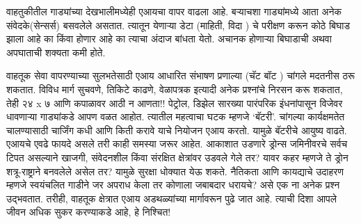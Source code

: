 वाहतुकीतील गाड्यांच्या देखभालीमध्येही एआयचा वापर वाढला आहे. बऱ्याचशा गाड्यांमध्ये आता अनेक संवेदके(सेन्सर्स) बसवलेले असतात. त्यातून येणाऱ्या डेटा (माहिती, विदा ) चे परीक्षण करून कोठे बिघाड झाला आहे का किंवा होणार आहे का त्याचा अंदाज बांधता येतो. अचानक होणाऱ्या बिघाडाची अथवा अपघाताची शक्यता कमी होते.

वाहतूक सेवा वापरण्याच्या सुलभतेसाठी एआय आधारित संभाषण प्रणाल्या (चॅट बॉट ) चांगले मदतनीस ठरू शकतात. विविध मार्ग सुचवणे, तिकिटे काढणे, वेळापत्रक इत्यादी अनेक प्रश्नांचे निरसन करू शकतात, तेही २४ x ७ आणि कपाळावर आठी न आणता!! पेट्रोल, डिझेल सारख्या पारंपरिक इंधनांपासून विजेवर धावणाऱ्या गाड्यांकडे आपण वळत आहोत. त्यातील महत्वाचा घटक म्हणजे `बॅटरी'. चांगल्या कार्यक्षमतेत चालण्यासाठी चार्जिंग कधी आणि किती करावे याचे नियोजन एआय करतो. यामुळे बॅटरीचे आयुष्य वाढते. एआयचे एवढे फायदे असले तरी काही समस्या जरूर आहेत. आकाशात उडणारे ड्रोन्स जमिनीवरचे सर्वच टिपत असल्याने खाजगी, संवेदनशील किंवा संरक्षित क्षेत्रांवर उडवले गेले तर? यावर कहर म्हणजे ते ड्रोन शत्रू-राष्ट्राने बनवलेले असेल तर? यामुळे सुरक्षा धोक्यात येऊ शकते. नैतिकता आणि कायद्याचे उदाहरण म्हणजे स्वयंचलित गाडीने जर अपराध केला तर कोणाला जबाबदार धरायचे? असे एक ना अनेक प्रश्न उद्भवतात. तरीही, वाहतूक क्षेत्रात एआय अडथळ्यांच्या मार्गावरून पुढे जात आहे. त्याची दिशा आपले जीवन अधिक सुकर करण्याकडे आहे, हे निश्चित!